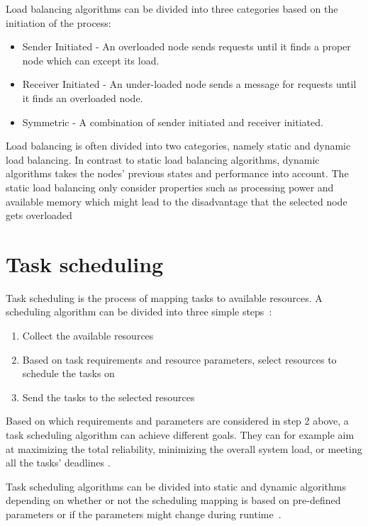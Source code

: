 \documentclass{cslthse-msc}
\begin{document}
Load balancing algorithms can be divided into three categories based on the initiation of the process:
\begin{itemize}
\item Sender Initiated - An overloaded node sends requests until it finds a proper node which can except its load.
\item Receiver Initiated - An under-loaded node sends a message for requests until it finds an overloaded node. %
\item Symmetric - A combination of sender initiated and receiver initiated. 
\end{itemize}

Load balancing is often divided into two categories, namely static and dynamic load balancing. In contrast to static load balancing algorithms, dynamic algorithms takes the nodes' previous states and performance into account. The static load balancing only consider properties such as processing power and available memory which might lead to the disadvantage that the selected node gets overloaded~\cite{perfAnalysisLoadCloud}

\section{Task scheduling} \label{sec:background_task_sched}
Task scheduling is the process of mapping tasks to available resources. A scheduling algorithm can be divided into three simple steps~\cite{optSchedCloud}:

\begin{enumerate}
	\item Collect the available resources
	\item Based on task requirements and resource parameters, select resources to schedule the tasks on
	\item Send the tasks to the selected resources
\end{enumerate}

Based on which requirements and parameters are considered in step 2 above, a task scheduling algorithm can achieve different goals. They can for example aim at maximizing the total reliability, minimizing the overall system load, or meeting all the tasks' deadlines \cite{schedulingSurvey}. 

Task scheduling algorithms can be divided into static and dynamic algorithms depending on whether or not the scheduling mapping is based on pre-defined parameters or if the parameters might change during runtime~\cite{schedReplicas}.
\end{document}
